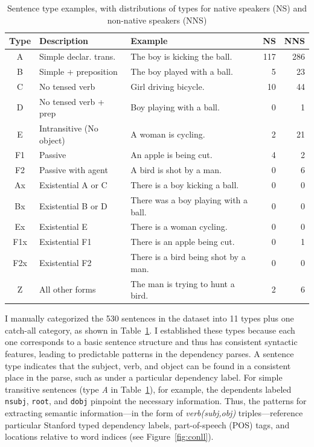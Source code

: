 \begin{table}[htb!]
\begin{center}
\begin{tabular}{|c|l|l|r|r|}
\hline
Type & Description & Example & NS & NNS \\
\hline
 A & Simple declar. trans. & The boy is kicking the ball. & 117 & 286 \\
 \hline
 B & Simple + preposition & The boy played with a ball. & 5 & 23 \\
 \hline
 C & No tensed verb & Girl driving bicycle. & 10 & 44 \\
 \hline
 D & No tensed verb + prep & Boy playing with a ball. & 0 & 1 \\
 \hline
 E & Intransitive (No object) & A woman is cycling. & 2 & 21 \\
 \hline
 F1 & Passive & An apple is being cut. & 4 & 2 \\
 \hline
 F2 & Passive with agent & A bird is shot by a man. & 0 & 6 \\
 \hline
 Ax & Existential A or C & There is a boy kicking a ball. & 0 & 0 \\
 \hline
 Bx & Existential B  or D & There was a boy playing with a ball. & 0 & 0 \\
 \hline
 Ex & Existential E & There is a woman cycling. & 0 & 0 \\
 \hline
 F1x & Existential F1 & There is an apple being cut. & 0 & 1 \\
 \hline
 F2x & Existential F2 & There is a bird being shot by a man. & 0 & 0 \\
 \hline
 Z & All other forms & The man is trying to hunt a bird. & 2 & 6 \\
 \hline
\end{tabular}
\end{center}
\caption{Sentence type examples, with distributions of types for
  native speakers (NS) and non-native speakers (NNS)}
\label{tab:sentence-type}
\end{table}


I manually categorized the 530 sentences in the dataset into 11 types plus one catch-all category, as shown in
Table~\ref{tab:sentence-type}. I established these types because each
one corresponds to a basic sentence structure and thus has consistent
syntactic features, leading to predictable patterns in the dependency
parses. A sentence type indicates that the subject,
verb, and object can be found in a consistent place in the parse,
such as under a particular dependency label.
For simple transitive sentences (type \textit{A} in Table~\ref{tab:sentence-type}), for example, the dependents labeled {\tt nsubj}, {\tt root}, and {\tt dobj} 
pinpoint the necessary information.
Thus, the patterns for extracting semantic information---in the form
of \textit{verb(subj,obj)} triples---reference particular Stanford
typed dependency labels, part-of-speech (POS) tags, and locations
relative to word indices (see Figure~\ref{fig:conll}).



